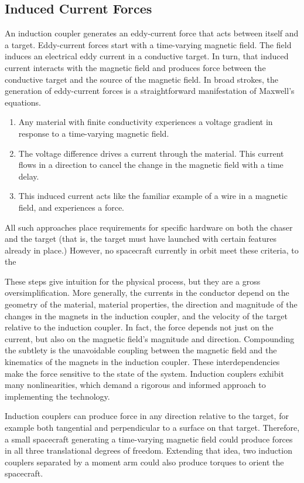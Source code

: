 %


\subsection{Induced Current Forces}

An induction coupler generates an eddy-current force that acts between itself and a target. Eddy-current forces start with a time-varying magnetic field. The field induces an electrical eddy current in a conductive target. In turn, that induced current interacts with the magnetic field and produces force between the conductive target and the source of the magnetic field.
In broad strokes, the generation of eddy-current forces is a straightforward manifestation of Maxwell's
equations. 
‎
\begin{enumerate}
\item Any material with finite conductivity experiences a voltage gradient in response to a time-varying magnetic field.
\item The voltage difference drives a current through the material. This current flows in a direction to cancel the change in the magnetic field with a time delay.
\item This induced current acts like the familiar example of a wire in a magnetic field, and experiences a force.
\end{enumerate}
 
All such approaches place requirements for specific hardware on both the chaser and the target (that is, the target must have launched with certain features already in place.) However, no spacecraft currently in orbit meet these criteria, to the

These steps give intuition for the physical process, but they are a gross oversimplification. More generally, the currents in the conductor depend on the geometry of the material, material properties, the direction and magnitude of the changes in the magnets in the induction coupler, and the velocity of the target relative to the induction coupler. In fact, the force depends not just on the current, but also on the magnetic field's magnitude and direction. Compounding the subtlety is the unavoidable coupling between the magnetic field and the kinematics of the magnets in the induction coupler. These interdependencies make the force sensitive to the state of the system. Induction couplers exhibit many nonlinearities, which demand a rigorous and informed approach to implementing the technology.

Induction couplers can produce force in any direction relative to the target, for example both tangential and perpendicular to a surface on that target. Therefore, a small spacecraft generating a time-varying magnetic field could produce forces in all three translational degrees of freedom. Extending that idea, two induction couplers separated by a moment arm could also produce torques to orient the spacecraft.

